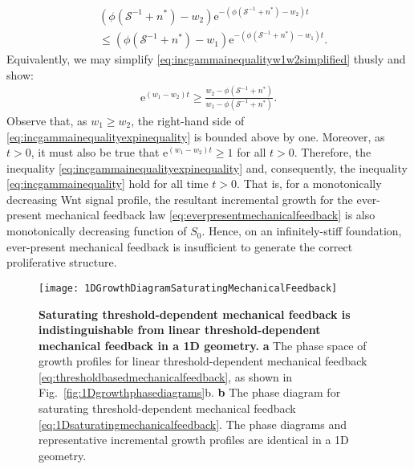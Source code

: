 \begin{align}
&(\phi(\mathcal{S}^{-1} + n^*) - w_2)\mathrm{e}^{-(\phi(\mathcal{S}^{-1} + n^*) - w_2)t}\nonumber
\\&\le  (\phi(\mathcal{S}^{-1} + n^*) - w_1)\mathrm{e}^{-(\phi(\mathcal{S}^{-1} + n^*) - w_1)t}.\label{eq:incgammainequalityw1w2simplified}
\end{align}
Equivalently, we may simplify \eqref{eq:incgammainequalityw1w2simplified} thusly and show:
\begin{align}
\mathrm{e}^{(w_1 - w_2)t} \ge \frac{w_2 - \phi(\mathcal{S}^{-1} + n^*)}{w_1 - \phi(\mathcal{S}^{-1} + n^*)}.\label{eq:incgammainequalityexpinequality}
\end{align}
Observe that, as $w_1 \ge w_2$, the right-hand side of \eqref{eq:incgammainequalityexpinequality} is bounded above by one. Moreover, as $t > 0$, it must also be true that $\mathrm{e}^{(w_1 - w_2)t} \ge 1$ for all $t > 0$. Therefore, the inequality \eqref{eq:incgammainequalityexpinequality} and, consequently, the inequality \eqref{eq:incgammainequality} hold for all time $t > 0$. That is, for a monotonically decreasing Wnt signal profile, the resultant incremental growth for the ever-present mechanical feedback law \eqref{eq:everpresentmechanicalfeedback} is also monotonically decreasing function of $S_0$. Hence, on an infinitely-stiff foundation, ever-present mechanical feedback is insufficient to generate the correct proliferative structure.

\begin{figure*}[t!]
	\centering
	\texttt{[image: 1DGrowthDiagramSaturatingMechanicalFeedback]}
	\caption{\textbf{Saturating threshold-dependent mechanical feedback is indistinguishable from linear threshold-dependent mechanical feedback in a 1D geometry.} \textbf{a} The phase space of growth profiles for linear threshold-dependent mechanical feedback \eqref{eq:thresholdbasedmechanicalfeedback}, as shown in Fig.\ \ref{fig:1Dgrowthphasediagrams}b. \textbf{b} The phase diagram for saturating threshold-dependent mechanical feedback \eqref{eq:1Dsaturatingmechanicalfeedback}. The phase diagrams and representative incremental growth profiles are identical in a 1D geometry. }
	\label{fig:1Dlinearvssaturatingthresholdbasedfeedback}
\end{figure*}

